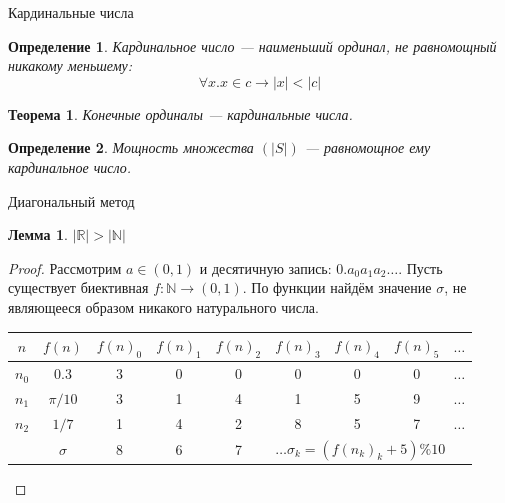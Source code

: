 \documentclass[aspectratio=169]{beamer}
\newtheorem{thm}{Теорема}[section]
\newtheorem{dfn}{Определение}[section]
\newtheorem{lmm}{Лемма}[section]
\begin{document}
\begin{frame}{Кардинальные числа}
\begin{dfn}Кардинальное число --- наименьший ординал, не равномощный никакому меньшему:
$$\forall x.x \in c \rightarrow |x| < |c|$$\end{dfn}
\begin{thm}Конечные ординалы --- кардинальные числа.\end{thm}
\begin{dfn}Мощность множества $(|S|)$ --- равномощное ему кардинальное число.\end{dfn}
\end{frame}

\begin{frame}{Диагональный метод}
\begin{lmm}$|\mathbb{R}| > |\mathbb{N}|$\end{lmm}
\begin{proof}Рассмотрим $a \in (0,1)$ и десятичную запись: $0.a_0a_1a_2\dots$.
Пусть существует биективная $f: \mathbb{N}\rightarrow (0,1)$.
По функции найдём значение $\sigma$, не являющееся образом никакого натурального числа.

\begin{center}\begin{tabular}{cc|ccccccl}
 $n$ &  $f(n)$ & $f(n)_0$ & $f(n)_1$ & $f(n)_2$ & $f(n)_3$ & $f(n)_4$ & $f(n)_5$ & $\dots$ \\\hline
 $n_0$ &  0.3  &  \color{red}3    & 0    &  0  &  0  &  0  &  0 & $\dots$ \\
 $n_1$ & $\pi/10$ &  3  & \color{red}1    &  4  &  1  &  5  &  9 & $\dots$ \\
 $n_2$ & $1/7$   & 1 &   4    &  \color{red}2  &  8  &  5  &  7 & $\dots$ \\\hline\pause
       & $\sigma$ & 8 &  6 &        7 &   \multicolumn{4}{l}{$\dots \sigma_k = (f(n_k)_k+5) \% 10$}
\end{tabular}\end{center}

\end{proof}
\end{frame}
\end{document}
